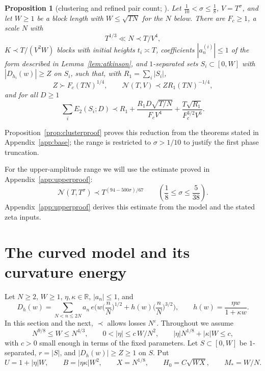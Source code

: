 \documentclass[11pt]{amsart}
\newtheorem{proposition}[theorem]{Proposition}
\theoremstyle{definition}
\theoremstyle{remark}
\numberwithin{equation}{section}
\newcommand{\cN}{\mathcal{N}}
\newcommand{\Mst}{M_{*}}
\begin{document}
\begin{proposition}[clustering and refined pair count; {\cite[\S\S7--9]{dFP}}]\label{in:dfp}
Let $\frac1{10}<\sigma\le\frac18$, $V=T^\sigma$, and let $W\ge1$ be a block length with $W\le\sqrt{TN}$ for the $N$ below. There are $F_c\ge1$, a scale $N$ with
\[
T^{1/3}\ll N\prec T/V^4,
\]
$K\prec T/(V^2W)$ blocks with initial heights $t_i\asymp T$, coefficients $|a^{(i)}_n|\le1$ of the form described in Lemma~\ref{lem:atkinson}, and $1$-separated sets $S_i\subset[0,W]$ with $|D_{h_i}(w)|\ge Z$ on $S_i$, such that, with $R_1=\sum_i|S_i|$,
\begin{equation}\label{eq:cluster}
Z\succ F_c(TN)^{1/4},\qquad \cN(T,V)\prec ZR_1(TN)^{-1/4},
\end{equation}
and for all $D\ge1$
\begin{equation}\label{eq:paircount}
\sum_iE_2(S_i;D)\prec R_1+\frac{R_1D\sqrt{T/N}}{F_cV^4}+\frac{T\sqrt{R_1}}{F_c^{3/2}V^6}.
\end{equation}
\end{proposition}
Proposition~\ref{prop:clusterproof} proves this reduction from the
theorems stated in Appendix~\ref{app:base}; the range is restricted to
$\sigma>1/10$ to justify the first phase truncation.

For the upper-amplitude range we will use the estimate proved in Appendix~\ref{app:upperproof}:
\begin{equation}\label{eq:dfpline}
\cN(T,T^\sigma)\prec T^{(94-500\sigma)/67}
\qquad\left(\frac18\le\sigma\le\frac5{38}\right).
\end{equation}
Appendix~\ref{app:upperproof} derives this estimate from the model and the stated zeta inputs.

\section{The curved model and its curvature energy}\label{sec:curved}

Let $N\ge2$, $W\ge1$, $\eta,\kappa\in\mathbb R$, $|a_n|\le1$, and
\begin{equation}\label{eq:model}
D_h(w)=\sum_{N<n\le2N}a_n\,e\Big(w\Big(\frac nN\Big)^{1/2}+h(w)\Big(\frac nN\Big)^{3/2}\Big),
\qquad h(w)=\frac{\eta w}{1+\kappa w}.
\end{equation}
In this section and the next, $\prec$ allows losses $N^{\varepsilon}$. Throughout we assume
\begin{equation}\label{eq:modelranges}
N^{9/8}\le W\le N^{4/3},\qquad 0<|\eta|\le c\,W/N^2,\qquad |\eta|N^{1/8}+|\kappa|W\le c,
\end{equation}
with $c>0$ small enough in terms of the fixed parameters. Let $S\subset[0,W]$ be $1$-separated, $r=|S|$, and $|D_h(w)|\ge Z\ge1$ on $S$. Put
\[
U=1+|\eta|W,\qquad B=|\eta\kappa|W^2,\qquad X=N^{1/8},\qquad H_0=C\sqrt{WX},\qquad \Mst=W/N .
\]
\end{document}
